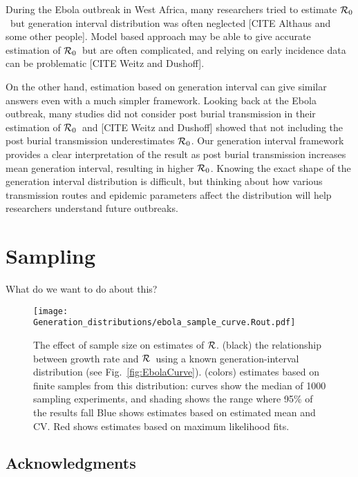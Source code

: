 \documentclass[12pt,]{article}
\newcommand{\RR}{\ensuremath{{\cal R}}}
\newcommand{\Rx}[1]{\ensuremath{{\cal R}_{#1}}}
\newcommand{\Ro}{\Rx{0}}
\newcommand{\fref}[1]{Fig.~\ref{fig:#1}}
\begin{document}
During the Ebola outbreak in West Africa, many researchers tried to estimate \Ro\ but generation interval distribution was often neglected [CITE Althaus and some other people].
Model based approach may be able to give accurate estimation of \Ro\ but are often complicated, and relying on early incidence data can be problematic [CITE Weitz and Dushoff].

On the other hand, estimation based on generation interval can give similar answers even with a much simpler framework.
Looking back at the Ebola outbreak, many studies did not consider post burial transmission in their estimation of \Ro\ and [CITE Weitz and Dushoff] showed that not including the post burial transmission underestimates \Ro.
Our generation interval framework provides a clear interpretation of the result as post burial transmission increases mean generation interval, resulting in higher \Ro.
Knowing the exact shape of the generation interval distribution is difficult, but thinking about how various transmission routes and epidemic parameters affect the distribution will help researchers understand future outbreaks.

\section{Sampling}

What do we want to do about this?

\begin{figure}[htbp] \centering
	\texttt{[image: Generation\_distributions/ebola\_sample\_curve.Rout.pdf]}
\caption{
%
The effect of sample size on estimates of \RR.
(black) the relationship between growth rate and \RR~using a known generation-interval distribution (see \fref{EbolaCurve}).
(colors) estimates based on finite samples from this distribution: curves show the median of 1000 sampling experiments, and shading shows the range where 95\% of the results fall
Blue shows estimates based on estimated mean and CV.
Red shows estimates based on maximum likelihood fits.
%
}
	\label{fig:ebolaSample}
\end{figure}

\subsection*{Acknowledgments}

\printbibliography
\end{document}
